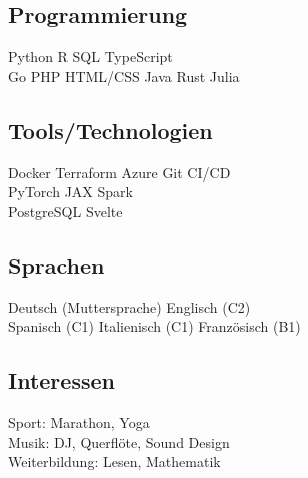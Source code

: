 \documentclass[letterpaper]{deedy-resume} %
\begin{document}
\begin{minipage}[t]{0.33\textwidth}
\subsection{Programmierung}
Python \textbullet{} R \textbullet{} SQL \textbullet{} TypeScript \\
Go \textbullet{} PHP \textbullet{} HTML/CSS \textbullet{} Java \textbullet{} Rust \textbullet{} Julia \\

\sectionspace

\subsection{Tools/Technologien}
Docker \textbullet{} Terraform \textbullet{} Azure \textbullet{} Git \textbullet{} CI/CD \\
PyTorch \textbullet{} JAX \textbullet{} Spark \\
PostgreSQL \textbullet{} Svelte
\sectionspace

\subsection{Sprachen}
Deutsch (Muttersprache) \textbullet{} Englisch (C2) \\
Spanisch (C1) \textbullet{} Italienisch (C1) \textbullet{} Französisch (B1)

\sectionspace
\subsection{Interessen}
Sport: Marathon, Yoga \\
Musik: DJ, Querflöte, Sound Design \\
Weiterbildung: Lesen, Mathematik
\sectionspace


\end{minipage} %
\hfill
%
%
\end{document}
